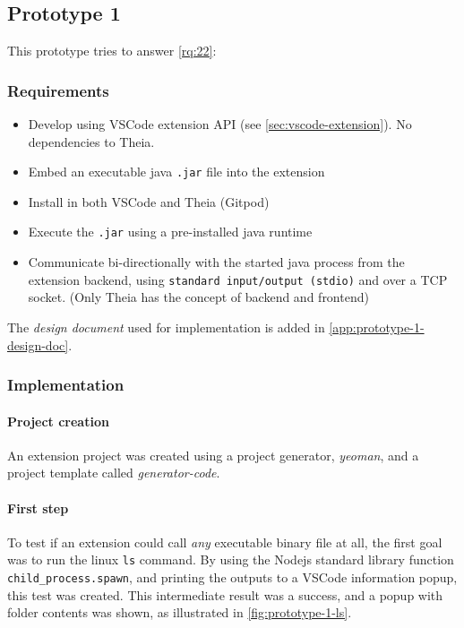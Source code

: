 \subsection{Prototype 1}

This prototype tries to answer \cref{rq:22}:
\begin{displayquote}
  
\end{displayquote}


\subsubsection{Requirements}

\begin{itemize}
  \item Develop using VSCode extension \acrshort{API} (see \cref{sec:vscode-extension}). No dependencies to Theia.
  \item Embed an executable java \texttt{.jar} file into the extension
  \item Install in both VSCode and Theia (Gitpod)
  \item Execute the \texttt{.jar} using a pre-installed java runtime
  \item Communicate bi-directionally with the started java process from the extension backend, using \texttt{standard input/output (stdio)} and over a TCP socket. (Only Theia has the concept of backend and frontend)
\end{itemize}

The \textit{design document} used for implementation is added in \cref{app:prototype-1-design-doc}.

\subsubsection{Implementation}

\paragraph*{Project creation}
An extension project was created using a project generator, \emph{yeoman}, and a project template called \emph{generator-code}.~\cite{microsoftYourFirstExtension2020}


\paragraph*{First step}
To test if an extension could call \emph{any} executable binary file at all, the first goal was to run the linux \texttt{ls} command.
By using the \gls{Nodejs} standard library function \texttt{child\_process.spawn}, and printing the outputs to a \gls{VSCode} information popup, this test was created.
This intermediate result was a success, and a popup with folder contents was shown, as illustrated in \cref{fig:prototype-1-ls}.

